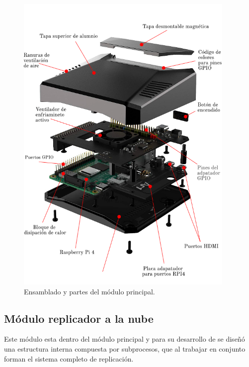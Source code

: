 \begin{figure}[htpb]
\centering 
\includegraphics[width=0.94\textwidth]{./Figures/armadoactuador.png}
\caption{Ensamblado y partes del módulo principal. }
\label{fig:argon}
\end{figure}


\subsection{Módulo replicador a la nube}

Este módulo esta dentro del módulo principal y para su desarrollo de se diseñó una estructura interna compuesta por subprocesos, que al trabajar en conjunto forman el sistema completo de replicación.

